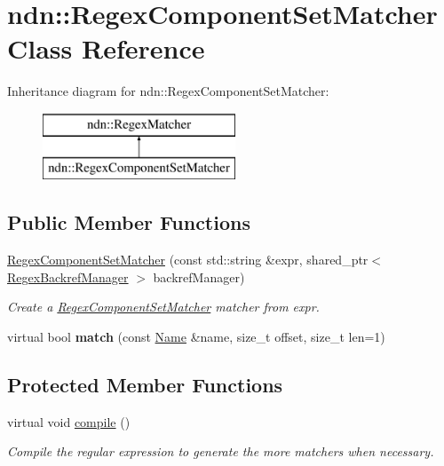\hypertarget{classndn_1_1RegexComponentSetMatcher}{}\section{ndn\+:\+:Regex\+Component\+Set\+Matcher Class Reference}
\label{classndn_1_1RegexComponentSetMatcher}
Inheritance diagram for ndn\+:\+:Regex\+Component\+Set\+Matcher\+:\begin{figure}[H]
\begin{center}
\leavevmode
\includegraphics[height=2.000000cm]{classndn_1_1RegexComponentSetMatcher}
\end{center}
\end{figure}
\subsection*{Public Member Functions}
\begin{DoxyCompactItemize}
\item 
\hyperlink{classndn_1_1RegexComponentSetMatcher_ac38cda9b6839478cb87c3dab44fef5da}{Regex\+Component\+Set\+Matcher} (const std\+::string \&expr, shared\+\_\+ptr$<$ \hyperlink{classndn_1_1RegexBackrefManager}{Regex\+Backref\+Manager} $>$ backref\+Manager)
\begin{DoxyCompactList}\small\item\em Create a \hyperlink{classndn_1_1RegexComponentSetMatcher}{Regex\+Component\+Set\+Matcher} matcher from expr. \end{DoxyCompactList}\item 
virtual bool {\bfseries match} (const \hyperlink{classndn_1_1Name}{Name} \&name, size\+\_\+t offset, size\+\_\+t len=1)\hypertarget{classndn_1_1RegexComponentSetMatcher_a7920f40be8100cd12e1fdf610e6e4121}{}\label{classndn_1_1RegexComponentSetMatcher_a7920f40be8100cd12e1fdf610e6e4121}

\end{DoxyCompactItemize}
\subsection*{Protected Member Functions}
\begin{DoxyCompactItemize}
\item 
virtual void \hyperlink{classndn_1_1RegexComponentSetMatcher_af578c46135e7c9aab08c13ded8a4374b}{compile} ()
\begin{DoxyCompactList}\small\item\em Compile the regular expression to generate the more matchers when necessary. \end{DoxyCompactList}\end{DoxyCompactItemize}
